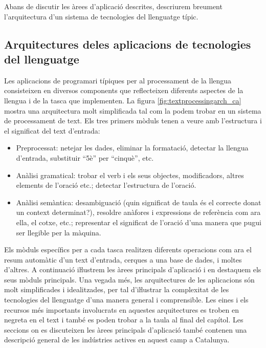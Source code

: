 \begin{multicols}{2}
Abans de discutir les àrees d'aplicació descrites, descriurem breument l'arquitectura d'un sistema de tecnologies del llenguatge típic.

\subsection[Arquitectures de les aplicacions de tecnologies del llenguatge]{Arquitectures de\newline les aplicacions de tecnologies del llenguatge}

Les aplicacions de programari típiques per al processament de la llengua consisteixen en diversos components que reflecteixen diferents aspectes de la llengua i de la tasca que implementen. La figura \ref{fig:textprocessingarch_ca} mostra una arquitectura molt simplificada tal com la podem trobar en un sistema de processament de text. Els tres primers mòduls tenen a veure amb l’estructura i el significat del text d’entrada:
\begin{itemize}
\item Preprocessat: netejar les dades, eliminar la formatació, detectar la llengua d’entrada, substituir “5è” per “cinquè”, etc.
\item Anàlisi gramatical: trobar el verb i els seus objectes, modificadors, altres elements de l'oració etc.; detectar l’estructura de l’oració.
\item Anàlisi semàntica: desambiguació (quin significat de taula és el correcte donat un context determinat?), resoldre anàfores i expressions de referència com ara ella, el cotxe, etc.; representar el significat de l’oració d’una manera que pugui ser llegible per la màquina.
\end{itemize}


Els mòduls específics per a cada tasca realitzen diferents operacions com ara el resum automàtic d’un text d’entrada, cerques a una base de dades, i moltes d’altres. A continuació iŀlustrem les àrees principals d’aplicació i en destaquem els seus mòduls principals. Una vegada més, les arquitectures de les aplicacions són molt simplificades i idealitzades, per tal d’iŀlustrar la complexitat de les tecnologies del llenguatge d’una manera general i comprensible. Les eines i els recursos més importants involucrats en aquestes arquitectures es troben en negreta en el text i també es poden trobar a la taula al final del capítol. Les seccions on es discuteixen les àrees principals d’aplicació també contenen una descripció general de les indústries actives en aquest camp a Catalunya.


\end{multicols}
